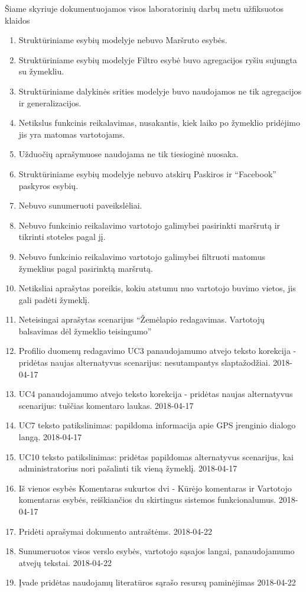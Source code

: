\documentclass{VUMIFPSkursinis}
\begin{document}
Šiame skyriuje dokumentuojamos visos laboratorinių darbų metu užfiksuotos klaidos
	\begin{enumerate}[itemsep=-2mm]
		\item Struktūriniame esybių modelyje nebuvo Maršruto esybės.
		\item Struktūriniame esybių modelyje Filtro esybė buvo agregacijos ryšiu sujungta su žymekliu.
		\item Struktūriniame dalykinės srities modelyje buvo naudojamos ne tik agregacijos ir generalizacijos.
		\item Netikslus funkcinis reikalavimas, nusakantis, kiek laiko po žymeklio pridėjimo jis yra matomas vartotojams.
		\item Užduočių aprašymuose naudojama ne tik tiesioginė nuosaka.
		\item Struktūriniame esybių modelyje nebuvo atskirų Paskiros ir “Facebook” paskyros esybių.
		\item Nebuvo sunumeruoti paveikslėliai.
		\item Nebuvo funkcinio reikalavimo vartotojo galimybei pasirinkti maršrutą ir tikrinti stoteles pagal jį.
		\item Nebuvo funkcinio reikalavimo vartotojo galimybei filtruoti matomus žymeklius pagal pasirinktą maršrutą.
		\item Netiksliai aprašytas poreikis, kokiu atstumu nuo vartotojo buvimo vietos, jis gali padėti žymeklį.
		\item Neteisingai aprašytas scenarijus “Žemėlapio redagavimas. Vartotojų balsavimas dėl žymeklio teisingumo”
		\item Profilio duomenų redagavimo UC3 panaudojamumo atvejo teksto korekcija - pridėtas naujas alternatyvus scenarijus: nesutampantys slaptažodžiai. 2018-04-17
		\item UC4 panaudojamumo atvejo teksto korekcija - pridėtas naujas alternatyvus scenarijus: tuščias komentaro laukas. 2018-04-17
		\item UC7 teksto patikslinimas: papildoma informacija apie GPS įrenginio dialogo langą. 2018-04-17
		\item UC10 teksto patikslinimas: pridėtas papildomas alternatyvus scenarijus, kai administratorius nori pašalinti tik vieną žymeklį. 2018-04-17
		\item Iš vienos esybės Komentaras sukurtos dvi - Kūrėjo komentaras ir Vartotojo komentaras esybės, reiškiančios du skirtingus sistemos funkcionalumus. 2018-04-17
		\item Pridėti aprašymai dokumento antraštėms. 2018-04-22
		\item Sunumeruotos visos verslo esybės, vartotojo sąsajos langai, panaudojamumo atvejų tekstai. 2018-04-22
		\item Įvade pridėtas naudojamų literatūros sąrašo resursų paminėjimas 2018-04-22

	\end{enumerate}
\end{document}
